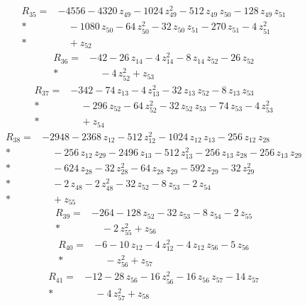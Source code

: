 \documentclass[10pt]{article}
\begin{document}
\begin{align*}
R_{35}={}& - 4556 - 4320\,z_{49} - 1024\,z_{49}^{2} - 512\,z_{49}\,z_{50} - 128\,z_{49}\,z_{51} \\*
&\quad - 1080\,z_{50} - 64\,z_{50}^{2} - 32\,z_{50}\,z_{51} - 270\,z_{51} - 4\,z_{51}^{2} \\*
&\quad + z_{52}
\end{align*}
\begin{align*}
R_{36}={}& - 42 - 26\,z_{14} - 4\,z_{14}^{2} - 8\,z_{14}\,z_{52} - 26\,z_{52} \\*
&\quad - 4\,z_{52}^{2} + z_{53}
\end{align*}
\begin{align*}
R_{37}={}& - 342 - 74\,z_{13} - 4\,z_{13}^{2} - 32\,z_{13}\,z_{52} - 8\,z_{13}\,z_{53} \\*
&\quad - 296\,z_{52} - 64\,z_{52}^{2} - 32\,z_{52}\,z_{53} - 74\,z_{53} - 4\,z_{53}^{2} \\*
&\quad + z_{54}
\end{align*}
\begin{align*}
R_{38}={}& - 2948 - 2368\,z_{12} - 512\,z_{12}^{2} - 1024\,z_{12}\,z_{13} - 256\,z_{12}\,z_{28} \\*
&\quad - 256\,z_{12}\,z_{29} - 2496\,z_{13} - 512\,z_{13}^{2} - 256\,z_{13}\,z_{28} - 256\,z_{13}\,z_{29} \\*
&\quad - 624\,z_{28} - 32\,z_{28}^{2} - 64\,z_{28}\,z_{29} - 592\,z_{29} - 32\,z_{29}^{2} \\*
&\quad - 2\,z_{48} - 2\,z_{48}^{2} - 32\,z_{52} - 8\,z_{53} - 2\,z_{54} \\*
&\quad + z_{55}
\end{align*}
\begin{align*}
R_{39}={}& - 264 - 128\,z_{52} - 32\,z_{53} - 8\,z_{54} - 2\,z_{55} \\*
&\quad - 2\,z_{55}^{2} + z_{56}
\end{align*}
\begin{align*}
R_{40}={}& - 6 - 10\,z_{12} - 4\,z_{12}^{2} - 4\,z_{12}\,z_{56} - 5\,z_{56} \\*
&\quad - z_{56}^{2} + z_{57}
\end{align*}
\begin{align*}
R_{41}={}& - 12 - 28\,z_{56} - 16\,z_{56}^{2} - 16\,z_{56}\,z_{57} - 14\,z_{57} \\*
&\quad - 4\,z_{57}^{2} + z_{58}
\end{align*}
\end{document}
